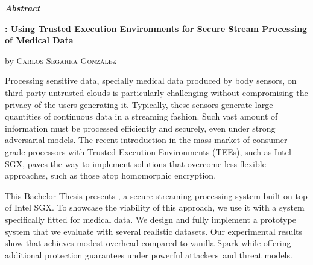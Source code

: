 \vspace*{2.00cm}
\begin{center}
%
%
%
%
%
%    

    \LARGE
    \textit{\textbf{Abstract}} \label{sec:abstract}

    \vspace{0.5cm}

    \large
    \textbf{\projName: Using Trusted Execution Environments for Secure Stream Processing of Medical Data}

    by \textsc{Carlos Segarra Gonz\'alez}
\end{center}

\vspace{0.5cm}

\normalsize
Processing sensitive data, specially medical data produced by body sensors, on third-party untrusted clouds is particularly challenging without compromising the privacy of the users generating it. Typically, these sensors generate large quantities of continuous data in a streaming fashion. Such vast amount of information must be processed efficiently and securely, even under strong adversarial models. The recent introduction in the mass-market of consumer-grade processors with Trusted Execution Environments (TEEs), such as Intel SGX, paves the way to implement solutions that overcome less flexible approaches, such as those atop homomorphic encryption. 
    
This Bachelor Thesis presents \projName, a secure streaming processing system built on top of Intel SGX. To showcase the viability of this approach, we use it with a system specifically fitted for medical data. We design and fully implement a prototype system that we evaluate with several realistic datasets. Our experimental results show that \projName achieves modest overhead compared to vanilla Spark while offering additional protection guarantees under powerful attackers and threat models.

